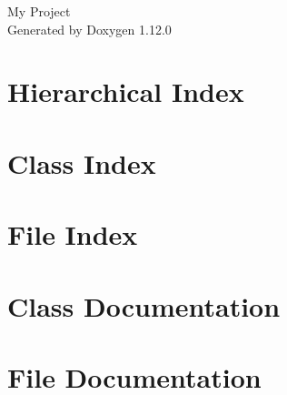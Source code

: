 \documentclass[twoside]{book}
\newcommand{\+}{\discretionary{\mbox{\scriptsize$\hookleftarrow$}}{}{}}
\newcommand{\clearemptydoublepage}{%
    \newpage{\pagestyle{empty}\cleardoublepage}%
  }
\begin{document}
  \raggedbottom
    \hypersetup{pageanchor=false,
                bookmarksnumbered=true,
                pdfencoding=unicode
               }
  \begin{titlepage}
  \vspace*{7cm}
  \begin{center}%
  {\Large My Project}\\
  \vspace*{1cm}
  {\large Generated by Doxygen 1.12.0}\\
  \end{center}
  \end{titlepage}
  \clearemptydoublepage
  \tableofcontents
  \clearemptydoublepage
  \hypersetup{pageanchor=true}
\chapter{Hierarchical Index}

\chapter{Class Index}

\chapter{File Index}

\chapter{Class Documentation}




\chapter{File Documentation}





  \backmatter
  \newpage
  \clearemptydoublepage
  \printindex
\end{document}
